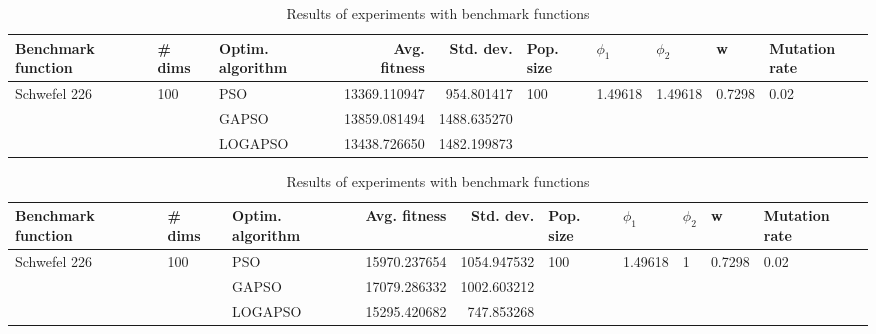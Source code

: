 \documentclass{article}
\begin{document}
\begin{table}
\centering
\caption{Results of experiments with benchmark functions}
\begin{tabular}{lllrrlllll}
\toprule
           Benchmark function &              \# dims & Optim. algorithm &  Avg. fitness &   Std. dev. &            Pop. size &               $\phi_{1}$ &               $\phi_{2}$ &                       w &         Mutation rate \\
\midrule
\multirow{3}{*}{Schwefel 226} & \multirow{3}{*}{100} &              PSO &  13369.110947 &  954.801417 & \multirow{3}{*}{100} & \multirow{3}{*}{1.49618} & \multirow{3}{*}{1.49618} & \multirow{3}{*}{0.7298} & \multirow{3}{*}{0.02} \\
                              &                      &            GAPSO &  13859.081494 & 1488.635270 &                      &                          &                          &                         &                       \\
                              &                      &          LOGAPSO &  13438.726650 & 1482.199873 &                      &                          &                          &                         &                       \\
\bottomrule
\end{tabular}
\end{table}
\begin{table}
\centering
\caption{Results of experiments with benchmark functions}
\begin{tabular}{lllrrlllll}
\toprule
           Benchmark function &              \# dims & Optim. algorithm &  Avg. fitness &   Std. dev. &            Pop. size &               $\phi_{1}$ &         $\phi_{2}$ &                       w &         Mutation rate \\
\midrule
\multirow{3}{*}{Schwefel 226} & \multirow{3}{*}{100} &              PSO &  15970.237654 & 1054.947532 & \multirow{3}{*}{100} & \multirow{3}{*}{1.49618} & \multirow{3}{*}{1} & \multirow{3}{*}{0.7298} & \multirow{3}{*}{0.02} \\
                              &                      &            GAPSO &  17079.286332 & 1002.603212 &                      &                          &                    &                         &                       \\
                              &                      &          LOGAPSO &  15295.420682 &  747.853268 &                      &                          &                    &                         &                       \\
\bottomrule
\end{tabular}
\end{table}
\end{document}
